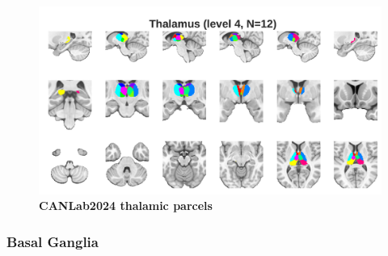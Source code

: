 \documentclass[10pt,letterpaper]{article}
\begin{document}
\begin{figure}[t]
\begin{minipage}{\linewidth}
\end{minipage}
\begin{minipage}{\linewidth}
\includegraphics[width=\linewidth]{images/thal_coarsest.png}
\end{minipage}
\caption{
{\bf
CANLab2024 thalamic parcels} 
}
\label{thalamus-granularities-figure}
\end{figure}

\subsubsection{Basal Ganglia}
\end{document}
